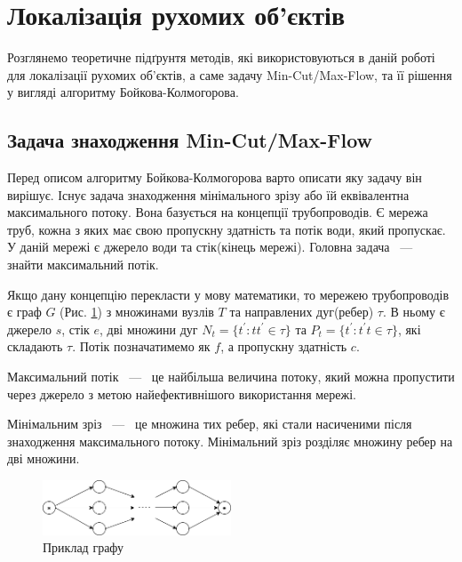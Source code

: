 \section{Локалізація рухомих об'єктів}

Розглянемо теоретичне підґрунтя методів, які використовуються в даній роботі для
локалізації рухомих об'єктів, а саме задачу Min-Cut/Max-Flow, та її рішення
у вигляді алгоритму Бойкова-Колмогорова.

\subsection{Задача знаходження Min-Cut/Max-Flow}

Перед описом алгоритму Бойкова-Колмогорова варто описати яку
задачу він вирішує. Існує задача знаходження мінімального зрізу або їй
еквівалентна максимального потоку. Вона базується на концепції
трубопроводів. Є мережа труб, кожна з яких має свою пропускну здатність
та потік води, який пропускає. У даній мережі є джерело води та стік(кінець мережі).
Головна задача ~---~ знайти максимальний потік.

Якщо дану концепцію перекласти у мову
математики, то мережею трубопроводів є граф $G$ (Рис. \ref{fig:graph_example})
з множинами вузлів $T$ та направлених дуг(ребер) $\tau$. В ньому є джерело $s$,
стік $e$, дві множини дуг $N_t = \{t^{'}: tt^{'} \in \tau \}$ та $P_t = \{t^{'}: t^{'}t \in \tau \}$,
які складають $\tau$. Потік позначатимемо як $f$, а пропускну здатність $c$.
\begin{definition}
    Максимальний потік ~---~  це найбільша величина потоку, який
    можна пропустити через джерело з метою найефективнішого  використання мережі.
\end{definition}

\begin{definition}
    Мінімальним зріз ~---~ це множина тих ребер, які стали насиченими після знаходження максимального
    потоку. Мінімальний зріз розділяє множину ребер на дві множини.
\end{definition}
\begin{figure}[H]
    \centering
    \includegraphics[width=0.5\textwidth]{images/graph_example}
    \caption{Приклад графу
        \label{fig:graph_example}
    }
\end{figure}

